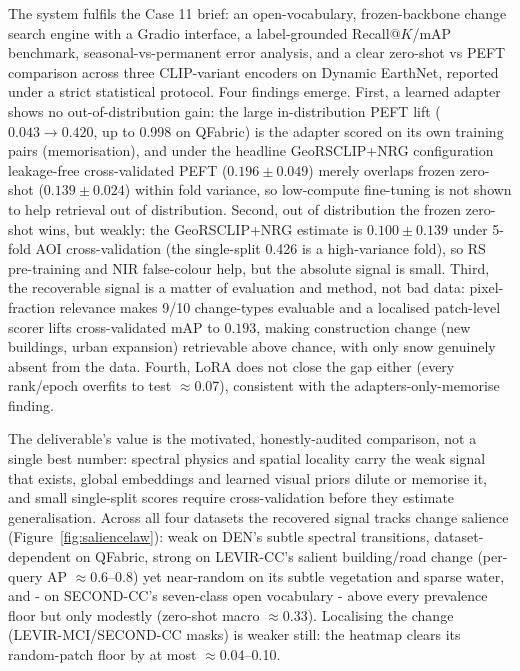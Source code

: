 \documentclass{article}
\begin{document}
The system fulfils the Case 11 brief: an open-vocabulary, frozen-backbone change
search engine with a Gradio interface, a label-grounded Recall@$K$/mAP benchmark,
seasonal-vs-permanent error analysis, and a clear zero-shot vs PEFT comparison
across three CLIP-variant encoders on Dynamic EarthNet, reported under a strict
statistical protocol. Four findings emerge. First, a learned adapter shows no
out-of-distribution gain: the large in-distribution PEFT lift
($0.043 \rightarrow 0.420$, up to 0.998 on QFabric) is the adapter scored on its
own training pairs (memorisation), and under the headline GeoRSCLIP+NRG
configuration leakage-free cross-validated PEFT ($0.196 \pm 0.049$) merely
overlaps frozen zero-shot ($0.139 \pm 0.024$) within fold variance, so low-compute
fine-tuning is not shown to help retrieval out of distribution. Second, out of
distribution the frozen zero-shot wins, but weakly: the GeoRSCLIP+NRG estimate is
$0.100 \pm 0.139$ under 5-fold AOI cross-validation (the single-split 0.426 is a
high-variance fold), so RS pre-training and NIR false-colour help, but the
absolute signal is small. Third, the recoverable signal is a matter of evaluation
and method, not bad data: pixel-fraction relevance makes 9/10 change-types
evaluable and a localised patch-level scorer lifts cross-validated mAP to
$0.193$, making construction change (new buildings, urban expansion) retrievable
above chance, with only snow genuinely absent from the data. Fourth, LoRA does
not close the gap either (every rank/epoch overfits to test $\approx$0.07),
consistent with the adapters-only-memorise finding.

The deliverable's value is the motivated, honestly-audited comparison, not a
single best number: spectral physics and spatial locality carry the weak signal
that exists, global embeddings and learned visual priors dilute or memorise it,
and small single-split scores require cross-validation before they estimate
generalisation. Across all four datasets the recovered signal tracks change
salience (Figure~\ref{fig:saliencelaw}): weak on DEN's subtle spectral
transitions, dataset-dependent on QFabric, strong on LEVIR-CC's salient
building/road change (per-query AP $\approx$0.6--0.8) yet near-random on its
subtle vegetation and sparse water, and - on SECOND-CC's seven-class open
vocabulary - above every prevalence floor but only modestly (zero-shot macro
$\approx$0.33). Localising the change (LEVIR-MCI/SECOND-CC masks) is weaker still:
the heatmap clears its random-patch floor by at most $\approx$0.04--0.10.
\end{document}
